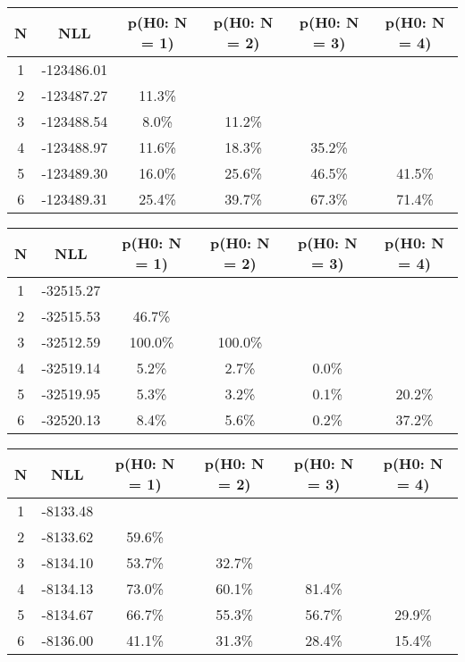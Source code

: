\begin{table}[htb]
	\begin{center}
{\footnotesize\renewcommand{\arraystretch}{1.4}
		\begin{tabular}{cc||cccc}
			N & NLL & p(H0: N = 1) & p(H0: N = 2) & p(H0: N = 3) & p(H0: N = 4)\\ 
		\hline
1 & -123486.01 & & & & \\
2 & -123487.27 & 11.3\% & & & \\
3 & -123488.54 & 8.0\% & 11.2\% & & \\
4 & -123488.97 & 11.6\% & 18.3\% & 35.2\% & \\
5 & -123489.30 & 16.0\% & 25.6\% & 46.5\% & 41.5\% \\
6 & -123489.31 & 25.4\% & 39.7\% & 67.3\% & 71.4\% \\
	\end{tabular}
		\label{tab:lab}
	}
	\end{center}\end{table}

\begin{table}[htb]
	\begin{center}
{\footnotesize\renewcommand{\arraystretch}{1.4}
		\begin{tabular}{cc||cccc}
			N & NLL & p(H0: N = 1) & p(H0: N = 2) & p(H0: N = 3) & p(H0: N = 4)\\ 
		\hline
1 & -32515.27 & & & & \\
2 & -32515.53 & 46.7\% & & & \\
3 & -32512.59 & 100.0\% & 100.0\% & & \\
4 & -32519.14 & 5.2\% & 2.7\% & 0.0\% & \\
5 & -32519.95 & 5.3\% & 3.2\% & 0.1\% & 20.2\% \\
6 & -32520.13 & 8.4\% & 5.6\% & 0.2\% & 37.2\% \\
	\end{tabular}
		\label{tab:lab}
	}
	\end{center}\end{table}

\begin{table}[htb]
	\begin{center}
{\footnotesize\renewcommand{\arraystretch}{1.4}
		\begin{tabular}{cc||cccc}
			N & NLL & p(H0: N = 1) & p(H0: N = 2) & p(H0: N = 3) & p(H0: N = 4)\\ 
		\hline
1 & -8133.48 & & & & \\
2 & -8133.62 & 59.6\% & & & \\
3 & -8134.10 & 53.7\% & 32.7\% & & \\
4 & -8134.13 & 73.0\% & 60.1\% & 81.4\% & \\
5 & -8134.67 & 66.7\% & 55.3\% & 56.7\% & 29.9\% \\
6 & -8136.00 & 41.1\% & 31.3\% & 28.4\% & 15.4\% \\
	\end{tabular}
		\label{tab:lab}
	}
	\end{center}\end{table}

